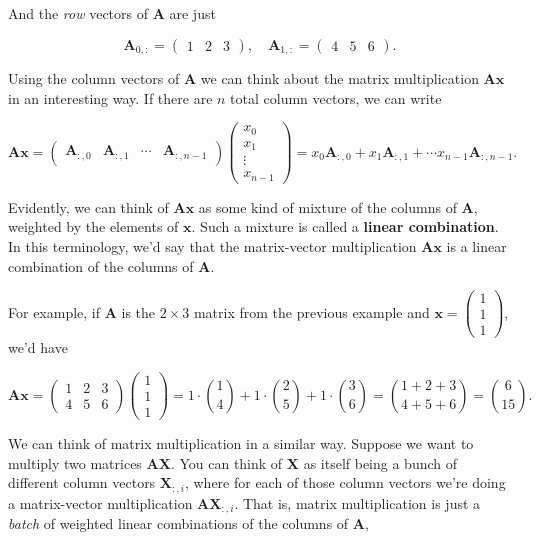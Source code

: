\documentclass[
  letterpaper,
  DIV=11,
  numbers=noendperiod]{scrreprt}
\begin{document}
And the \emph{row} vectors of \(\mathbf{A}\) are just

\[\mathbf{A}_{0, :} = \begin{pmatrix} 1 & 2 & 3 \end{pmatrix}, \quad \mathbf{A}_{1, :} = \begin{pmatrix} 4 & 5 & 6 \end{pmatrix}.\]

Using the column vectors of \(\mathbf{A}\) we can think about the matrix
multiplication \(\mathbf{A} \mathbf{x}\) in an interesting way. If there
are \(n\) total column vectors, we can write

\[
\mathbf{A} \mathbf{x} = 
\begin{pmatrix}
\mathbf{A}_{:, 0} & \mathbf{A}_{:, 1} & \cdots & \mathbf{A}_{:, n-1}
\end{pmatrix}
\begin{pmatrix}
x_0 \\
x_1 \\
\vdots \\
x_{n-1}
\end{pmatrix} = 
x_0 \mathbf{A}_{:, 0} + x_1 \mathbf{A}_{:, 1} + \cdots x_{n-1} \mathbf{A}_{:, n-1}.
\]

Evidently, we can think of \(\mathbf{A} \mathbf{x}\) as some kind of
mixture of the columns of \(\mathbf{A}\), weighted by the elements of
\(\mathbf{x}\). Such a mixture is called a \textbf{linear combination}.
In this terminology, we'd say that the matrix-vector multiplication
\(\mathbf{A} \mathbf{x}\) is a linear combination of the columns of
\(\mathbf{A}\).

For example, if \(\mathbf{A}\) is the \(2 \times 3\) matrix from the
previous example and
\(\mathbf{x} = \begin{pmatrix} 1 \\ 1 \\ 1 \end{pmatrix}\), we'd have

\[
\mathbf{A} \mathbf{x} = 
\begin{pmatrix}
1 & 2 & 3 \\
4 & 5 & 6
\end{pmatrix}
\begin{pmatrix}
1 \\
1 \\
1
\end{pmatrix} = 1 \cdot \binom{1}{4} + 1 \cdot \binom{2}{5} + 1 \cdot \binom{3}{6} = \binom{1+2+3}{4+5+6} = \binom{6}{15}.
\]

We can think of matrix multiplication in a similar way. Suppose we want
to multiply two matrices \(\mathbf{A} \mathbf{X}\). You can think of
\(\mathbf{X}\) as itself being a bunch of different column vectors
\(\mathbf{X}_{:, i}\), where for each of those column vectors we're
doing a matrix-vector multiplication \(\mathbf{A}\mathbf{X}_{:, i}\).
That is, matrix multiplication is just a \emph{batch} of weighted linear
combinations of the columns of \(\mathbf{A}\),
\end{document}
